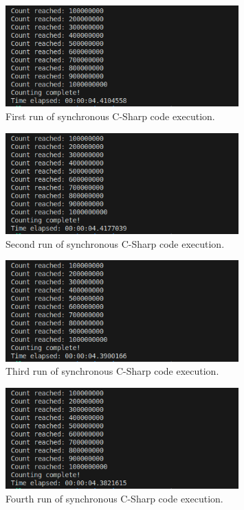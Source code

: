 \documentclass{article}
\begin{document}
\begin{figure}[htbp]
    \centering
    \includegraphics[width=0.8\textwidth]{../records/results_cs/result_1.png}
    \caption{First run of synchronous C-Sharp code execution.}
    \label{fig:C-Sharp-runtime-1}
\end{figure}

\begin{figure}[htbp]
    \centering
    \includegraphics[width=0.8\textwidth]{../records/results_cs/result_2.png}
    \caption{Second run of synchronous C-Sharp code execution.}
    \label{fig:C-Sharp-runtime-2}
\end{figure}

\begin{figure}[htbp]
    \centering
    \includegraphics[width=0.8\textwidth]{../records/results_cs/result_3.png}
    \caption{Third run of synchronous C-Sharp code execution.}
    \label{fig:C-Sharp-runtime-3}
\end{figure}

\begin{figure}[htbp]
    \centering
    \includegraphics[width=0.8\textwidth]{../records/results_cs/result_4.png}
    \caption{Fourth run of synchronous C-Sharp code execution.}
    \label{fig:C-Sharp-runtime-4}
\end{figure}
\end{document}
